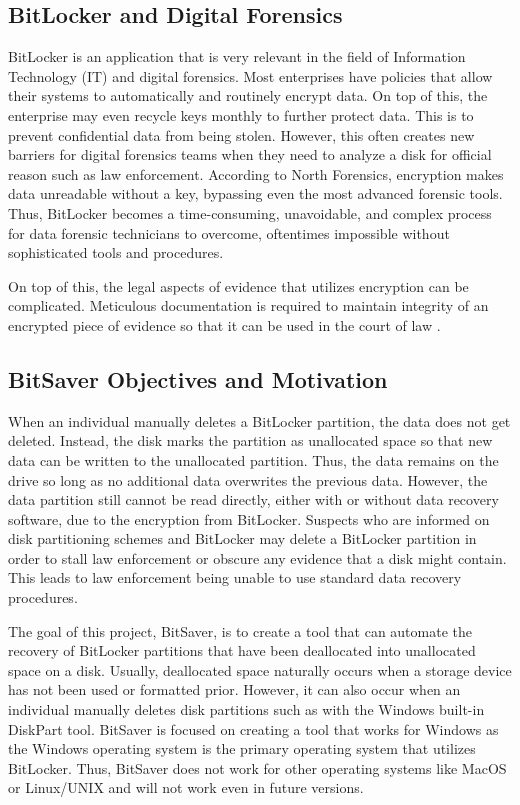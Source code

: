 \documentclass[conference]{IEEEtran} \IEEEoverridecommandlockouts
\begin{document}
\subsection{BitLocker and Digital Forensics} BitLocker is an application that
is very relevant in the field of Information Technology (IT) and digital
forensics. Most enterprises have policies that allow their systems to
automatically and routinely encrypt data. On top of this, the enterprise may even
recycle keys monthly to further protect data. This is to prevent confidential
data from being stolen. However, this often creates new barriers for digital
forensics teams when they need to analyze a disk for official reason such as
law enforcement. According to North Forensics, encryption makes data unreadable
without a key, bypassing even the most advanced forensic tools. Thus, BitLocker becomes a
time-consuming, unavoidable, and complex process for data forensic technicians to overcome, oftentimes
impossible without sophisticated tools and procedures.

On top of this, the legal aspects of evidence that utilizes encryption can be
complicated. Meticulous documentation is required to maintain integrity of an
encrypted piece of evidence so that it can be used in the court of law \cite{b5}.

\subsection{BitSaver Objectives and Motivation} When an individual manually
deletes a BitLocker partition, the data does not get deleted. Instead, the disk
marks the partition as unallocated space so that new data can be written to the unallocated partition.
Thus, the data remains on the drive so long as no additional data overwrites the previous data.
However, the data partition still cannot be read directly, either with or without data recovery software,
due to the encryption from BitLocker. Suspects who are
informed on disk partitioning schemes and BitLocker may delete a BitLocker partition in order
to stall law enforcement or obscure any evidence that a disk might contain. This leads to law enforcement
being unable to use standard data recovery procedures.

The goal of this project, BitSaver, is to create a tool that can automate the recovery of
BitLocker partitions that have been deallocated into unallocated space on a disk.
Usually, deallocated space naturally occurs when a storage device has not been used or formatted prior.
However, it can also occur when an individual manually deletes disk partitions such
as with the Windows built-in DiskPart tool. BitSaver is focused on creating a tool that works for
Windows as the Windows operating system is the primary operating system that utilizes BitLocker. Thus,
BitSaver does not work for other operating systems like MacOS or Linux/UNIX and will not work even in
future versions.
\end{document}
